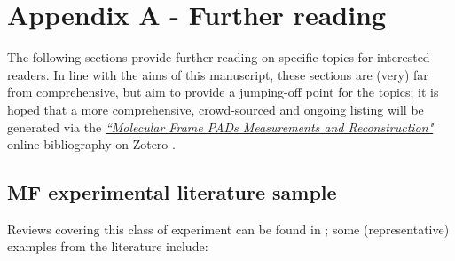 \documentclass[10pt]{article}
\begin{document}
\section{Appendix A - Further reading\label{sec:Appendix-A}}

The following sections provide further reading on specific topics for interested readers. In line with the aims of this manuscript, these sections are (very) far from comprehensive, but aim to provide a jumping-off point for the topics; it is hoped that a more comprehensive, crowd-sourced and ongoing listing will be generated via the \href{https://www.zotero.org/groups/4733878/molecular_frame_pads_measurements_and_reconstruction}{\textit{``Molecular Frame PADs Measurements and Reconstruction"}} online bibliography on Zotero \cite{hockettZoteroGroupsMolecular}.

\subsection{MF experimental literature sample\label{appendix:MF-expt}}

Reviews covering this class of experiment can be found in  \cite{Yagishita2005,Reid2012,dowek2012PhotoionizationDynamicsPhotoemission,Yagishita2015, jahnke2022PhotoelectronDiffraction, dowek2022TrendsAngleresolvedMolecular}; some (representative) examples from the literature include:
\end{document}
